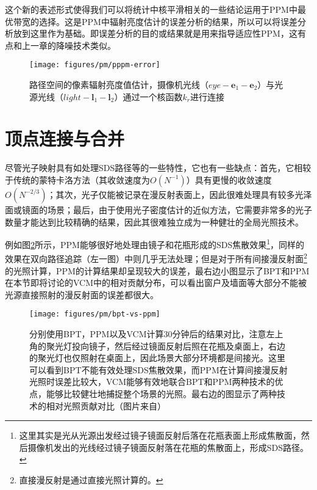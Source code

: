 这个新的表述形式使得我们可以将统计中核平滑相关的一些结论运用于PPM中最优带宽的选择。这是PPM中辐射亮度估计的误差分析的结果，所以可以将误差分析放到这里作为基础。即误差分析的目的或结果就是用来指导适应性PPM，这有点和上一章的降噪技术类似。

\begin{figure}
	\sidecaption
	\texttt{[image: figures/pm/pppm-error]}
	\caption{路径空间的像素辐射亮度值估计，摄像机光线（$eye-\mathbf{e}_1-\mathbf{e}_2$）与光源光线（$light-\mathbf{l}_1-\mathbf{l}_2$）通过一个核函数$k_r$进行连接}
	\label{f:pm-pppm-error}
\end{figure}






\section{顶点连接与合并}\label{sec:pm-vcm}
尽管光子映射具有如处理SDS路径等的一些特性，它也有一些缺点：首先，它相较于传统的蒙特卡洛方法（其收敛速度为$O(N^{-1})$）具有更慢的收敛速度$O(N^{-2/3})$；其次，光子仅能被记录在漫反射表面上，因此很难处理具有较多光泽面或镜面的场景；最后，由于使用光子密度估计的近似方法，它需要非常多的光子数量才能达到比较精确的结果，因此其很难独立成为一种健壮的全局光照技术。

例如图\ref{f:pm-bpt-vs-ppm}所示，PPM能够很好地处理由镜子和花瓶形成的SDS焦散效果\footnote{这里其实是光从光源出发经过镜子镜面反射后落在花瓶表面上形成焦散面，然后摄像机发出的光线经过镜子镜面反射落在花瓶的焦散面上，形成SDS路径。}，同样的效果在双向路径追踪（左一图）中则几乎无法处理；但是对于所有间接漫反射面\footnote{直接漫反射是通过直接光照计算的。}的光照计算，PPM的计算结果却呈现较大的误差，最右边小图显示了BPT和PPM在本节即将讨论的VCM中的相对贡献分布，可以看出窗户及墙面等大部分不能被光源直接照射的漫反射面的误差都很大。

\begin{figure}
\begin{fullwidth}	
	\texttt{[image: figures/pm/bpt-vs-ppm]}
	\caption{分别使用BPT，PPM以及VCM计算30分钟后的结果对比，注意左上角的聚光灯投向镜子，然后经过镜面反射后照在花瓶及桌面上，右边的聚光灯也仅照射在桌面上，因此场景大部分环境都是间接光。这里可以看到BPT不能有效处理SDS焦散效果，而PPM在计算间接漫反射光照时误差比较大，VCM能够有效地联合BPT和PPM两种技术的优点，能够比较健壮地捕捉整个场景的光照。最右边的图显示了两种技术的相对光照贡献对比（图片来自\cite{a:LightTransportSimulationwithVertexConnectionandMerging}）}
	\label{f:pm-bpt-vs-ppm}
\end{fullwidth}
\end{figure}

